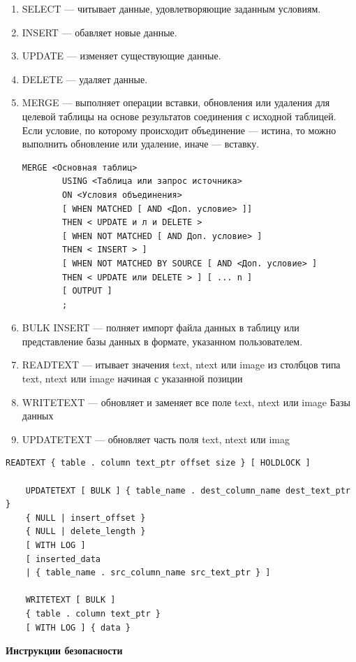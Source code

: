 \begin{enumerate}
	\item SELECT — читывает данные, удовлетворяющие заданным условиям.
	\item INSERT — обавляет новые данные.
	\item UPDATE — изменяет существующие данные.
	\item DELETE — удаляет данные.
	\item MERGE — выполняет операции вставки, обновления или удаления для целевой таблицы на основе результатов соединения с исходной таблицей. Если условие, по которому происходит объединение — истина, то можно выполнить обновление или удаление, иначе — вставку.
	
	\begin{lstlisting}[label=updatetext]
		MERGE <Основная таблиц>
		USING <Таблица или запрос источника>
		ON <Условия объединения>
		[ WHEN MATCHED [ AND <Доп. условие> ]]
		THEN < UPDATE и л и DELETE >
		[ WHEN NOT MATCHED [ AND Доп. условие> ]
		THEN < INSERT > ]
		[ WHEN NOT MATCHED BY SOURCE [ AND <Доп. условие> ]
		THEN < UPDATE или DELETE > ] [ ... n ]
		[ OUTPUT ]
		;
	\end{lstlisting}
	
	
	\item BULK INSERT — полняет импорт файла данных в таблицу или представление базы данных в формате, указанном пользователем.
	\item READTEXT — итывает значения text, ntext или image из столбцов типа text, ntext или image начиная
	с указанной позиции
	\item WRITETEXT — обновляет и заменяет все поле text, ntext или image
	Базы данных
	\item UPDATETEXT — обновляет часть поля text, ntext или imag
\end{enumerate}

\begin{lstlisting}[label=updatetext]
	READTEXT { table . column text_ptr offset size } [ HOLDLOCK ]
	
	UPDATETEXT [ BULK ] { table_name . dest_column_name dest_text_ptr }
	{ NULL | insert_offset }
	{ NULL | delete_length }
	[ WITH LOG ]
	[ inserted_data
	| { table_name . src_column_name src_text_ptr } ]
	
	WRITETEXT [ BULK ]
	{ table . column text_ptr }
	[ WITH LOG ] { data }
\end{lstlisting}

\clearpage
\textbf{Инструкции безопасности}

